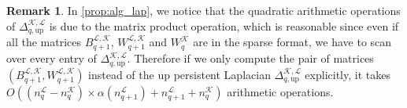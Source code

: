\documentclass{article}
\theoremstyle{definition}
\newtheorem{remark}[theorem]{Remark}
\newtheorem{proposition}[theorem]{Proposition}
\newcommand{\KK}{\mathcal{K}}
\newcommand{\LL}{\mathcal{L}}
\begin{document}
\begin{remark}\label{rmk:cmpt_time}
In \cref{prop:alg_lap},
we notice that the quadratic arithmetic operations of $\Delta_{q, \text{up}}^{\KK, \LL}$ is due to the matrix product operation, 
which is reasonable since even if all the matrices $B_{q+1}^{\LL, \KK}$, $W_{q+1}^{\LL, \KK}$ and $W_q^\KK$ are in the sparse format, 
we have to scan over every entry of $\Delta_{q, \text{up}}^{\KK, \LL}$.
Therefore if we only compute the pair of matrices $(B_{q+1}^{\LL, \KK}, W_{q+1}^{\LL, \KK})$ instead of the up persistent Laplacian $\Delta_{q, \text{up}}^{\KK, \LL}$ explicitly,
it takes $O\left((n_q^\LL-n_q^\KK)\times \alpha(n_{q+1}^\LL) + n_{q+1}^\LL+n_q^\KK\right)$ arithmetic operations.
\end{remark}

\end{document}
